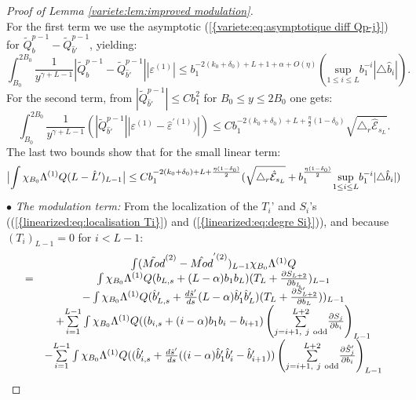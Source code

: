 \documentclass[11pt,a4paper,reqno]{amsart}
\theoremstyle{remark}
\numberwithin{equation}{section}
\begin{document}
\begin{proof}[Proof of Lemma \ref{variete:lem:improved modulation}]
$$$$
For the first term we use the asymptotic {{\rm (\ref{{variete:eq:asymptotique diff Qp-j}})}} for $\tilde{Q}_b^{p-1}-\tilde{Q}_{\hat{b}'}^{p-1}$, yielding:
$$
\int_{B_0}^{2B_0} \frac{1}{y^{\gamma+L-1}}|\tilde{Q}_b^{p-1}-\tilde{Q}_{\hat{b}'}^{p-1}||\varepsilon^{(1)}|\leq b_1^{-2(k_0+\delta_0)+L+1+\alpha+O(\eta)}(\underset{1\leq i \leq L}{\text{sup}}b_1^{-i}|\triangle \hat{b}_i|).
$$
For the second term, from $|\tilde{Q}_{\hat{b}'}^{p-1}|\leq C b_1^{2} $ for $B_0\leq y\leq 2B_0$ one gets:
$$
\int_{B_0}^{2B_0} \frac{1}{y^{\gamma+L-1}}(|\tilde{Q}_{\hat{b}'}^{p-1}||\varepsilon^{(1)}-\hat{\varepsilon}^{'(1)})|)\leq Cb_1^{-2(k_0+\delta_0)+L+\frac{\eta}{2}(1-\delta_0)}\sqrt{\triangle_r \hat{\mathcal{E}}_{s_L}} .
$$
The last two bounds show that for the small linear term:
\begin{equation} \label{variete:eq:estimation premier terme improved intermediaire L}
\bigl{|} \int \chi_{B_0} \Lambda^{(1)}Q (L-\hat{L}')_{L-1} \bigr{|} \leq Cb_1^{-2(k_0+\delta_0)+L+\frac{\eta (1-\delta_0)}{2}}(\sqrt{\triangle_r \hat{\mathcal{E}}_{s_L}}+b_1^{\frac{\eta (1-\delta_0)}{2}}\underset{1\leq i \leq L}{\text{sup}}b_1^{-i}|\triangle \hat{b}_i|)
\end{equation}
$\bullet$ \emph{The modulation term:} From the localization of the $T_i$' and $S_i$'s ({{\rm (\ref{{linearized:eq:localisation Ti}})}} and {{\rm (\ref{{linearized:eq:degre Si}})}}), and because $(T_i)_{L-1}=0$ for $i<L-1$:
\begin{equation} \label{variete:eq:estimation premier terme improved intermediaire mod}
\begin{array}{r c l}
&\int (\tilde{Mod}^{(2)}-\hat{Mod}^{'(2)})_{L-1}\chi_{B_0}\Lambda^{(1)} Q \\
=& \int \chi_{B_0}\Lambda^{(1)}Q (b_{L,s}+(L-\alpha)b_1b_L) (T_L+\frac{\partial S_{L+2}}{\partial b_L})_{L-1}\\
&-\int\chi_{B_0}\Lambda^{(1)}Q(\hat{b}'_{L,s}+\frac{d\hat{s}'}{ds}(L-\alpha)\hat{b}'_1\hat{b}'_L) (T_L+\frac{\partial \hat{S}'_{L+2}}{\partial b_L}))_{L-1} \\
& +\underset{i=1}{\overset{L-1}{\sum}}\int \chi_{B_0}\Lambda^{(1)}Q ((b_{i,s}+(i-\alpha)b_1b_i-b_{i+1}) \left( \underset{j=i+1, \ j \ \text{odd}}{\overset{L+2}{\sum}}\frac{\partial S_{j}}{\partial b_i} \right)_{L-1} \\
&-\underset{i=1}{\overset{L-1}{\sum}}\int \chi_{B_0}\Lambda^{(1)}Q ((\hat{b}'_{i,s}+\frac{d\hat{s}'}{ds}((i-\alpha)\hat{b}'_1\hat{b}'_i-\hat{b}'_{i+1})) \left( \underset{j=i+1, \ j \ \text{odd}}{\overset{L+2}{\sum}}\frac{\partial \hat{S}'_{j}}{\partial b_i}\right)_{L-1} \\

\end{array}
\end{equation}
\end{proof}
\end{document}
